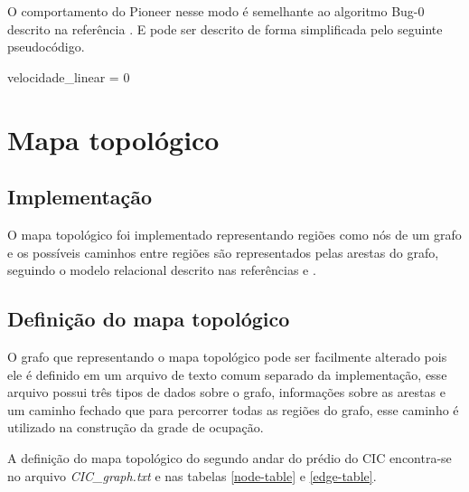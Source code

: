 \documentclass{llncs}
\begin{document}
O comportamento do Pioneer nesse modo é semelhante ao algoritmo Bug-0 descrito na referência \cite{Bug}. E pode ser descrito de forma simplificada pelo seguinte pseudocódigo.

\pagebreak
\begin{algorithmic}
		\State {}
		\State velocidade\_linear = 0
		\State {}
		\State {}
		\State {}
	\Else
		\State {}
		\State {}
	\EndIf
\EndWhile
\end{algorithmic}


\section{Mapa topológico} \label{sec:graph}
\subsection{Implementação}
O mapa topológico foi implementado representando regiões como nós de um grafo e os possíveis caminhos entre regiões são representados pelas arestas do grafo, seguindo o modelo relacional descrito nas referências \cite{AI} e \cite{slides}.

\subsection{Definição do mapa topológico}
O grafo que representando o mapa topológico pode ser facilmente alterado pois ele é definido em um arquivo de texto comum separado da implementação, esse arquivo possui três tipos de dados sobre o grafo, informações sobre as arestas e um caminho fechado que para percorrer todas as regiões do grafo, esse caminho é utilizado na construção da grade de ocupação.

A definição do mapa topológico do segundo andar do prédio do CIC encontra-se no arquivo \textit{CIC\_graph.txt} e nas tabelas \ref{node-table} e \ref{edge-table}.
\end{document}
